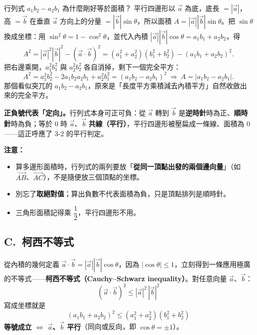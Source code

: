 \documentclass[11pt]{article}
\begin{document}
\begin{補充框}{行列式 $a_1b_2-a_2b_1$ 為什麼剛好等於面積？}
平行四邊形以 $\vec a$ 為底，底長 $=|\vec a|$，高 $=\vec b$ 在垂直 $\vec a$ 方向上的分量 $=|\vec b|\sin\theta$，所以面積 $A=|\vec a||\vec b|\sin\theta$。把 $\sin\theta$ 換成坐標：用 $\sin^2\theta=1-\cos^2\theta$，並代入內積 $|\vec a||\vec b|\cos\theta=a_1b_1+a_2b_2$，得
$$A^2=|\vec a|^2|\vec b|^2-(\vec a\cdot\vec b)^2=(a_1^2+a_2^2)(b_1^2+b_2^2)-(a_1b_1+a_2b_2)^2.$$
把右邊乘開，$a_1^2b_1^2$ 與 $a_2^2b_2^2$ 各自消掉，剩下一個完全平方：
$$A^2=a_1^2b_2^2-2a_1b_2a_2b_1+a_2^2b_1^2=(a_1b_2-a_2b_1)^2\ \Longrightarrow\ A=|a_1b_2-a_2b_1|.$$
那個看似突兀的 $a_1b_2-a_2b_1$，原來是「長度平方乘積減去內積平方」自然收斂出來的完全平方。

\textbf{正負號代表「定向」。}行列式本身可正可負：從 $\vec a$ 轉到 $\vec b$ 是\textbf{逆時針}時為正、\textbf{順時針}時為負；等於 $0$ 時 $\vec a$、$\vec b$ \textbf{共線（平行）}，平行四邊形被壓扁成一條線、面積為 $0$——這正呼應了 3-2 的平行判定。
\end{補充框}

\textbf{注意：}
\begin{itemize}\setlength{\itemsep}{1pt}
\item 算多邊形面積時，行列式的兩列要放「\textbf{從同一頂點出發的兩個邊向量}」（如 $\overrightarrow{AB}$、$\overrightarrow{AC}$），不是隨便放三個頂點的坐標。
\item 別忘了\textbf{取絕對值}；算出負數不代表面積為負，只是頂點排列是順時針。
\item 三角形面積記得乘 $\dfrac12$，平行四邊形不用。
\end{itemize}

\subsection*{\sffamily C.\ 柯西不等式}

從內積的幾何定義 $\vec a\cdot\vec b=|\vec a||\vec b|\cos\theta$，因為 $|\cos\theta|\le1$，立刻得到一條應用極廣的不等式——\textbf{柯西不等式（Cauchy–Schwarz inequality）}。對任意向量 $\vec a$、$\vec b$：
$$\boxed{\;(\vec a\cdot\vec b)^2\le|\vec a|^2\,|\vec b|^2\;}$$
寫成坐標就是
$$\boxed{\;(a_1 b_1+a_2 b_2)^2\le(a_1^2+a_2^2)(b_1^2+b_2^2)\;}$$
\textbf{等號成立 $\iff$ $\vec a$、$\vec b$ 平行}（同向或反向，即 $\cos\theta=\pm1$）。

\end{document}

